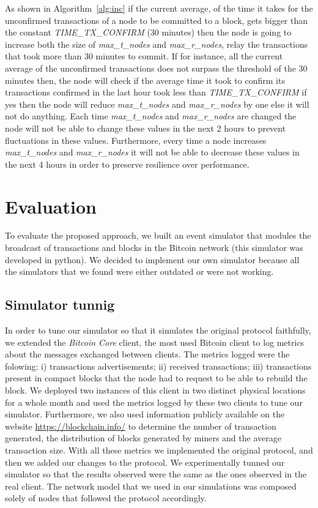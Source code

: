 \documentclass{dads}   %
\begin{document}
As shown in Algorithm~\ref{alg:inc} if the current average, of the time it takes for the unconfirmed transactions of a node to be committed to a block, gets bigger than the constant \textsl{TIME\_TX\_CONFIRM} (30 minutes) then the node is going to increase both the size of \textsl{max\_t\_nodes} and \textsl{max\_r\_nodes}, relay the transactions that took more than 30 minutes to commit. If for instance, all the current average of the unconfirmed transactions does not surpass the threshold of the 30 minutes then, the node will check if the average time it took to confirm its transactions confirmed in the last hour took less than \textsl{TIME\_TX\_CONFIRM} if yes then the node will reduce \textsl{max\_t\_nodes} and \textsl{max\_r\_nodes} by one else it will not do anything. Each time \textsl{max\_t\_nodes} and \textsl{max\_r\_nodes} are changed the node will not be able to change these values in the next 2 hours to prevent fluctuations in these values. Furthermore, every time a node increases \textsl{max\_t\_nodes} and \textsl{max\_r\_nodes} it will not be able to decrease these values in the next 4 hours in order to preserve resilience over performance.

\section{Evaluation}
To evaluate the proposed approach, we built an event simulator that modules the broadcast of transactions and blocks in the Bitcoin network (this simulator was developed in python). We decided to implement our own simulator because all the simulators that we found were either outdated or were not working.

\subsection{Simulator tunnig}
In order to tune our simulator so that it simulates the original protocol faithfully, we extended the \textsl{Bitcoin Core} client, the most used Bitcoin client to log metrics about the messages exchanged between clients. The metrics logged were the folowing: i) transactions advertisements; ii) received transactions; iii) transactions present in compact blocks that the node had to request to be able to rebuild the block. We deployed two instances of this client in two distinct physical locations for a whole month and used the metrics logged by these two clients to tune our simulator. Furthermore, we also used information publicly available on the website \url{https://blockchain.info/} to determine the number of transaction generated, the distribution of blocks generated by miners and the average transaction size. With all these metrics we implemented the original protocol, and then we added our changes to the protocol. We experimentally tunned our simulator so that the results observed were the same as the ones observed in the real client. The network model that we used in our simulations was composed solely of nodes that followed the protocol accordingly.
\end{document}
